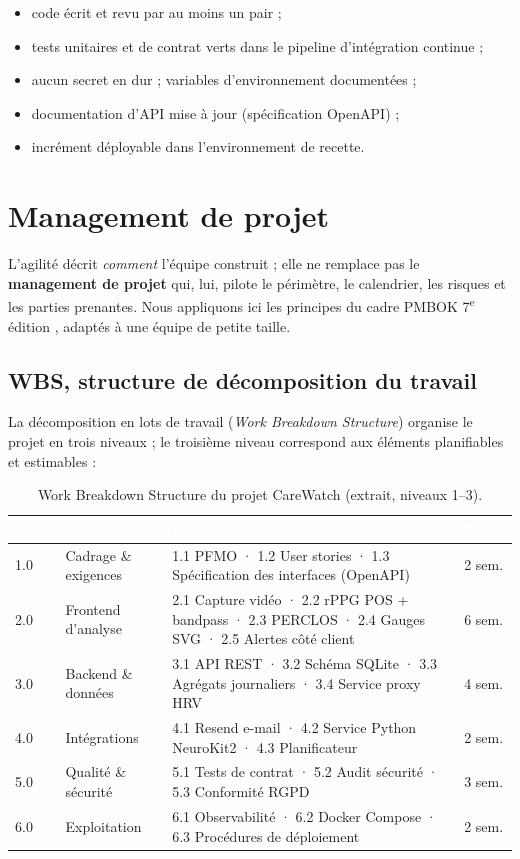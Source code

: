 \documentclass[11pt,a4paper]{article}
\begin{document}
\begin{itemize}[leftmargin=1.6em,itemsep=1pt]
 \item code écrit et revu par au moins un pair ;
 \item tests unitaires et de contrat verts dans le pipeline d'intégration continue ;
 \item aucun secret en dur ; variables d'environnement documentées ;
 \item documentation d'API mise à jour (spécification OpenAPI) ;
 \item incrément déployable dans l'environnement de recette.
\end{itemize}
\section{Management de projet}
\label{sec:pm}

L'agilité décrit \textit{comment} l'équipe construit ; elle ne remplace pas le \textbf{management de
projet} qui, lui, pilote le périmètre, le calendrier, les risques et les parties prenantes. Nous
appliquons ici les principes du cadre PMBOK 7\textsuperscript{e} édition \cite{pmbok2021}, adaptés à une
équipe de petite taille.

\subsection{WBS, structure de décomposition du travail}
La décomposition en lots de travail (\textit{Work Breakdown Structure}) organise le projet en trois
niveaux ; le troisième niveau correspond aux éléments planifiables et estimables :

\begin{table}[H]
\centering\small
\begin{tabularx}{\linewidth}{p{1.3cm} p{4.6cm} X c}
\toprule
\rowcolor{cwblue} \textcolor{white}{\bf Code} & \textcolor{white}{\bf Lot niveau 1} & \textcolor{white}{\bf Éléments
niveau 2--3} & \textcolor{white}{\bf Durée} \\
\midrule
1.0 & Cadrage \& exigences & 1.1 PFMO · 1.2 User stories · 1.3 Spécification des interfaces (OpenAPI) & 2 sem. \\
2.0 & Frontend d'analyse & 2.1 Capture vidéo · 2.2 rPPG POS + bandpass · 2.3 PERCLOS · 2.4 Gauges SVG ·
 2.5 Alertes côté client & 6 sem. \\
3.0 & Backend \& données & 3.1 API REST · 3.2 Schéma SQLite · 3.3 Agrégats journaliers · 3.4 Service
 proxy HRV & 4 sem. \\
4.0 & Intégrations & 4.1 Resend e-mail · 4.2 Service Python NeuroKit2 · 4.3 Planificateur & 2 sem. \\
5.0 & Qualité \& sécurité & 5.1 Tests de contrat · 5.2 Audit sécurité · 5.3 Conformité RGPD &
 3 sem. \\
6.0 & Exploitation & 6.1 Observabilité · 6.2 Docker Compose · 6.3 Procédures de déploiement & 2 sem. \\
\bottomrule
\end{tabularx}
\caption{Work Breakdown Structure du projet CareWatch (extrait, niveaux 1--3).}
\label{tab:wbs}
\end{table}
\end{document}
